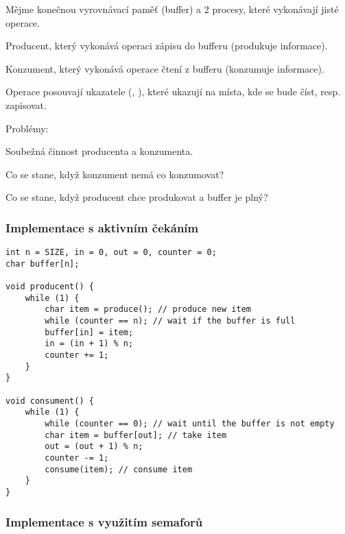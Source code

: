 \begin{compactitem}
    \item Mějme konečnou vyrovnávací paměť (buffer) a 2 procesy, které vykonávají jisté operace. \begin{compactitem}
        \item Producent, který vykonává operaci zápisu do bufferu (produkuje informace).
        \item Konzument, který vykonává operace čtení z bufferu (konzumuje informace).
    \end{compactitem}
    \item Operace posouvají ukazatele (, ), které ukazují na místa, kde se bude číst, resp. zapisovat.
    \item Problémy: \begin{compactitem}
        \item Soubežná činnost producenta a konzumenta.
        \item Co se stane, když konzument nemá co konzumovat?
        \item Co se stane, když producent chce produkovat a buffer je plný?
    \end{compactitem}
\end{compactitem}

\subsubsection{Implementace s aktivním čekáním}

\noindent\begin{minipage}{\linewidth}
\begin{lstlisting}[language=c_language, caption={Implementace s aktivním čekáním.}]
int n = SIZE, in = 0, out = 0, counter = 0;
char buffer[n];

void producent() {
    while (1) {
        char item = produce(); // produce new item
        while (counter == n); // wait if the buffer is full
        buffer[in] = item;
        in = (in + 1) % n;
        counter += 1;
    }
}

void consument() {
    while (1) {
        while (counter == 0); // wait until the buffer is not empty
        char item = buffer[out]; // take item
        out = (out + 1) % n;
        counter -= 1;
        consume(item); // consume item
    }
}
\end{lstlisting}
\end{minipage}

\subsubsection{Implementace s využitím semaforů}

